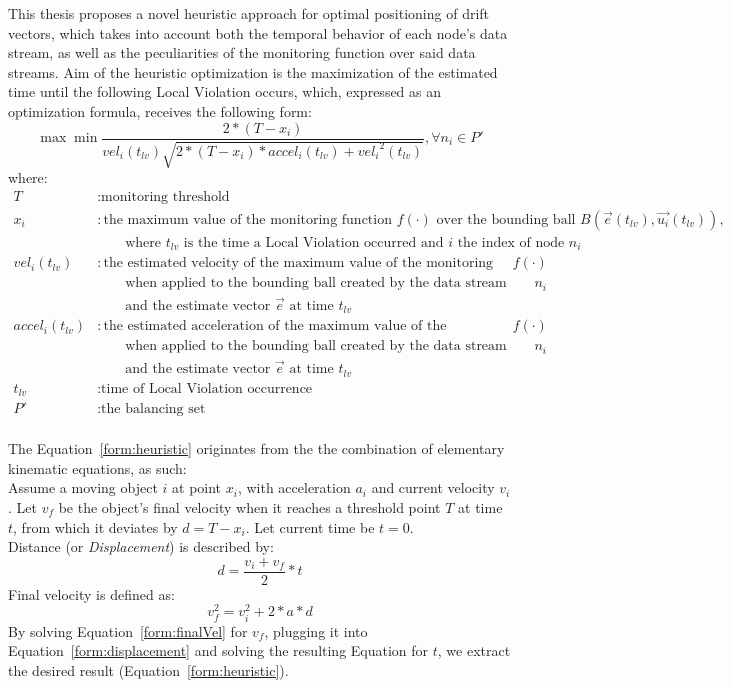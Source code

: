 This thesis proposes a novel heuristic approach for optimal positioning of drift vectors, which takes into account both the temporal behavior of each node's data stream, as well as the peculiarities of the monitoring function over said data streams. Aim of the heuristic optimization is the maximization of the estimated time until the following Local Violation occurs, which, expressed as an optimization formula, receives the following form:
\newpage
\begin{equation}
\max\min\frac{2*(T-x_i)}{vel_i(t_{lv})\sqrt{2*(T-x_i)*accel_i(t_{lv})+{vel_i}^2(t_{lv})}}, \forall n_i \in P'
\label{form:heuristic}
\end{equation}
where:
\begin{align*}
T&:\text{monitoring threshold}\\
x_i&:\text{the maximum value of the monitoring function $f(\cdot)$ over the bounding ball $B(\vec{e}(t_{lv}), \vec{u_i}(t_{lv}))$,}\\&\qquad\text{where $t_{lv}$ is the time a Local Violation occurred and $i$ the index of node $n_i$}\\
vel_i(t_{lv})&:\text{the estimated velocity of the maximum value of the monitoring function $f(\cdot)$}\\&\qquad\text{when applied to the bounding ball created by the data stream update of node $n_i$}\\&\qquad\text{and the estimate vector $\vec{e}$ at time $t_{lv}$}\\
accel_i(t_{lv})&:\text{the estimated acceleration of the maximum value of the monitoring function $f(\cdot)$}\\&\qquad\text{when applied to the bounding ball created by the data stream update of node $n_i$}\\&\qquad\text{and the estimate vector $\vec{e}$ at time $t_{lv}$}\\
t_{lv}&:\text{time of Local Violation occurrence}\\
P'&:\text{the balancing set}\\
\end{align*}

The Equation~\ref{form:heuristic} originates from the the combination of elementary kinematic equations, as such:\\
Assume a moving object $i$ at point $x_i$, with acceleration $a_i$ and current velocity $v_i$. Let $v_f$ be the object's final velocity when it reaches a threshold point $T$ at time $t$, from which it deviates by $d=T-x_i$. Let current time be $t=0$.\\
Distance (or \emph{Displacement}) is described by:
\begin{equation}
d=\frac{v_i+v_f}{2}*t
\label{form:displacement}
\end{equation}
Final velocity is defined as:
\begin{equation}
v_f^2=v_i^2+2*a*d
\label{form:finalVel}
\end{equation}
By solving Equation~\ref{form:finalVel} for $v_f$, plugging it into Equation~\ref{form:displacement} and solving the resulting Equation for $t$, we extract the desired result (Equation~\ref{form:heuristic}).

